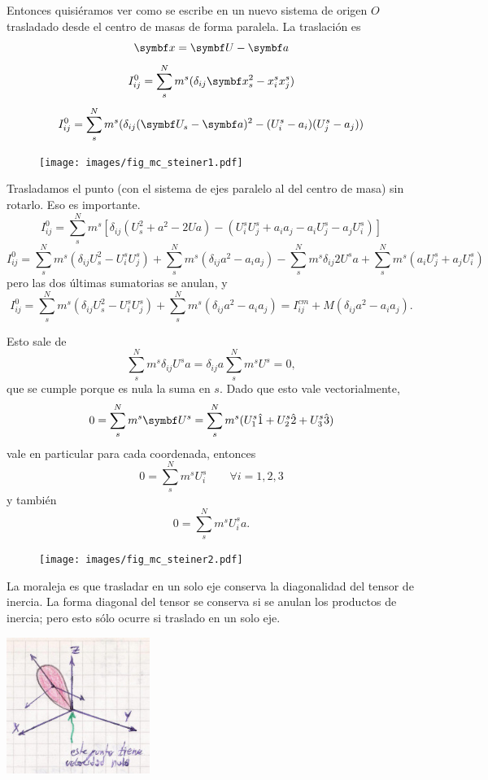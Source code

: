 \documentclass[10pt,oneside]{CBFT_book}
\begin{document}
Entonces quisiéramos ver como se escribe en un nuevo sistema de origen $O$ trasladado desde el centro de masas de
forma paralela. La traslación es
\[
	\vb{x} = \vb{U} - \vb{a}  
\]
\[
	I_{ij}^0 = \sum_s^N m^s ( \delta_{ij} \vb{x}_s^2 - x_i^s x_j^s )
\]
\[
	I_{ij}^0 = \sum_s^N m^s ( \delta_{ij} ( \vb{U}_s - \vb{a} )^2 - (U^s_i - a_i) ( U^s_j - a_j ) )
\]
\begin{figure}[htb]
	\begin{center}
	\texttt{[image: images/fig\_mc\_steiner1.pdf]}	 
	\end{center}
	\caption{}
\end{figure} 
Trasladamos el punto (con el sistema de ejes paralelo al del centro de masa) sin rotarlo. Eso es importante.
\[
	I_{ij}^0 = \sum_s^N m^s \left[  \delta_{ij} ( U_s^2 + a^2 - 2Ua ) -
			( U^s_iU^s_j + a_i a_j - a_i U^s_j - a_j U^s_i ) \right]
\]
\[
	I_{ij}^0 = \sum_s^N m^s ( \delta_{ij} U_s^2 - U^s_iU^s_j ) + \sum_s^N m^s ( \delta_{ij} a^2 - a_i a_j )
			- \sum_s^N m^s \delta_{ij} 2 U^s a  + \sum_s^N m^s ( a_i U^s_j + a_j U^s_i )
\]
pero las dos últimas sumatorias se anulan, y
\[
	I_{ij}^0 = \sum_s^N m^s ( \delta_{ij} U_s^2 - U^s_iU^s_j ) + \sum_s^N m^s ( \delta_{ij} a^2 - a_i a_j )
		= I_{ij}^{cm}  + M ( \delta_{ij} a^2 - a_i a_j ).
\]

Esto sale de
\[
	\sum_s^N m^s \delta_{ij} U^s a = \delta_{ij} a \sum_s^N m^s U^s = 0,
\]
que se cumple porque es nula la suma en $s$. Dado que esto vale vectorialmente, 
\[
	0 = \sum_s^N m^s \vb{U}^s = \sum_s^N m^s ( U_1^s \hat{1} + U_2^s \hat{2} + U_3^s \hat{3} )
\]
vale en particular para cada coordenada, entonces 
\[
	0 = \sum_s^N m^s U_i^s \qquad \forall i=1,2,3
\]
y también
\[
	0 = \sum_s^N m^s U_i^s a.
\]
\begin{figure}
	\begin{center}
	\texttt{[image: images/fig\_mc\_steiner2.pdf]}	 
	\end{center}
	\caption{}
\end{figure} 
La moraleja es que trasladar en un solo eje conserva la diagonalidad del tensor de inercia.
La forma diagonal del tensor se conserva si se anulan los productos de inercia; pero esto sólo
ocurre si traslado en un solo eje.

\includegraphics[width=0.35\textwidth]{images/fig_mc_steiner_3.jpg}
\end{document}
